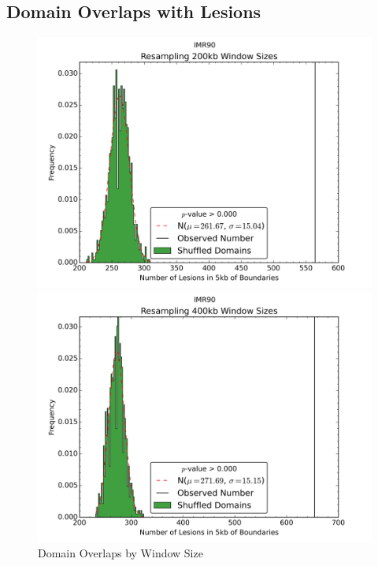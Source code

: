 \newpage
\subsection*{Domain Overlaps with Lesions}

\begin{figure}[H]
  \caption{Domain Overlaps by Window Size}
  \begin{minipage}{0.5\textwidth}%
    \includegraphics[width=\textwidth]{./figures/supplementary/domains/boundaries-IMR90-200kb.png}
  \end{minipage}%
  \hfill
  \begin{minipage}{0.5\textwidth}
    \centering
    \includegraphics[width=\textwidth]{./figures/supplementary/domains/boundaries-IMR90-400kb.png}
  \end{minipage}%


\end{figure}
